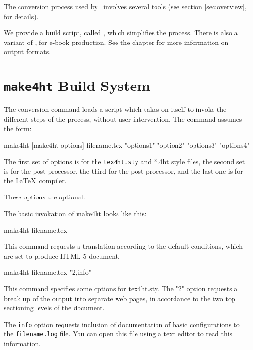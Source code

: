 The conversion process used by \texfourht\ involves several tools
(see section \ref{sec:overview},  for details). 


We provide a build script, called \makefourht, which simplifies the 
process. There is also a variant of \makefourht{},  
for e-book production. See the chapter 
for more information on output formats.


\section{\texttt{make4ht} Build System}
\label{sec:make4ht-intro}

The conversion command loads a script which takes on itself to invoke the
different steps of the process, without user intervention. The command assumes
the form:

\begin{shellcommand}
make4ht [make4ht options] filename.tex "options1" "option2" "options3" "options4"
\end{shellcommand}

The first set of options is for the \texttt{tex4ht.sty} and *.4ht style files, the
second set is for the  post-processor, the third for the 
post-processor, and the last one is for the \LaTeX\ compiler. 

These options are optional.

The basic invokation of make4ht looks like this:

\begin{shellcommand}
make4ht filename.tex
\end{shellcommand}

This command requests a translation according to the default conditions, which are set to produce HTML 5 document.

\begin{shellcommand}
make4ht filename.tex "2,info"
\end{shellcommand}

This command specifies some options for tex4ht.sty. The "2" option requests a
break up of the output into separate web pages, in accordance to the two top
sectioning levels of the document.

The \texttt{info} option requests inclusion of documentation of basic configurations to the \texttt{filename.log} file.
You can open this file using a text editor to read this information.

